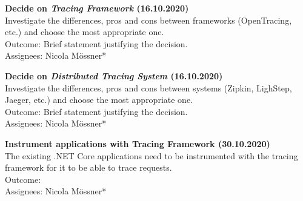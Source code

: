 \documentclass[11pt]{article}
\begin{document}

\textbf{Decide on \textit{Tracing Framework} (16.10.2020)}\\
Investigate the differences, pros and cons between frameworks (OpenTracing, etc.) and choose the most appropriate one.\\
Outcome: Brief statement justifying the decision.\\
Assignees: Nicola M\"{o}ssner*

\textbf{Decide on \textit{Distributed Tracing System} (16.10.2020)}\\
Investigate the differences, pros and cons between systems (Zipkin, LighStep, Jaeger, etc.) and choose the most appropriate one.\\
Outcome: Brief statement justifying the decision.\\
Assignees: Nicola M\"{o}ssner*

\textbf{Instrument applications with Tracing Framework (30.10.2020)}\\
The existing .NET Core applications need to be instrumented with the tracing framework for it to be able to trace requests. \\
Outcome: \\
Assignees: Nicola M\"{o}ssner*
\end{document}
